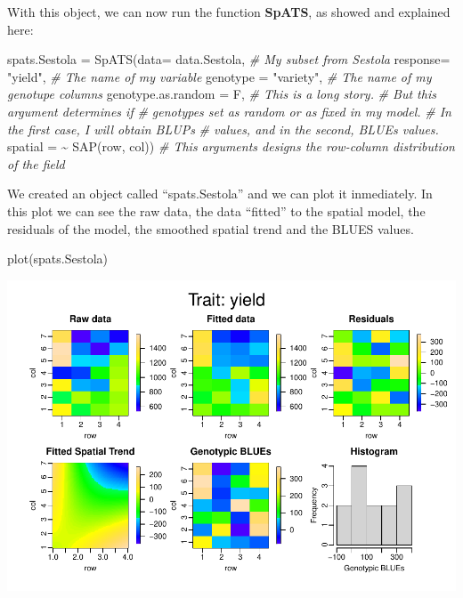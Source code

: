 \documentclass[
]{book}
\newenvironment{Shaded}{\begin{snugshade}}{\end{snugshade}}
\newcommand{\AttributeTok}[1]{\textcolor[rgb]{0.77,0.63,0.00}{#1}}
\newcommand{\CommentTok}[1]{\textcolor[rgb]{0.56,0.35,0.01}{\textit{#1}}}
\newcommand{\FunctionTok}[1]{\textcolor[rgb]{0.00,0.00,0.00}{#1}}
\newcommand{\NormalTok}[1]{#1}
\newcommand{\OtherTok}[1]{\textcolor[rgb]{0.56,0.35,0.01}{#1}}
\newcommand{\SpecialCharTok}[1]{\textcolor[rgb]{0.00,0.00,0.00}{#1}}
\newcommand{\StringTok}[1]{\textcolor[rgb]{0.31,0.60,0.02}{#1}}
\begin{document}
With this object, we can now run the function \textbf{SpATS}, as showed and explained here:

\begin{Shaded}
\begin{Highlighting}[]
\NormalTok{spats.Sestola  }\OtherTok{=}    \FunctionTok{SpATS}\NormalTok{(}\AttributeTok{data=}\NormalTok{      data.Sestola,    }\CommentTok{\# My subset from Sestola  }
                          \AttributeTok{response=} \StringTok{"yield"}\NormalTok{,          }\CommentTok{\# The name of my variable}
                          \AttributeTok{genotype =} \StringTok{"variety"}\NormalTok{,       }\CommentTok{\# The name of my genotupe columns}
                          \AttributeTok{genotype.as.random =}\NormalTok{ F,     }\CommentTok{\# This is a long story. }
                                                      \CommentTok{\# But this argument determines if}
                                                      \CommentTok{\# genotypes set as random or as fixed in my model.}
                                                      \CommentTok{\# In the first case, I will obtain BLUPs }
                                                      \CommentTok{\# values, and in the second, BLUEs values.}
                          \AttributeTok{spatial =} \SpecialCharTok{\textasciitilde{}} \FunctionTok{SAP}\NormalTok{(row, col))  }\CommentTok{\# This arguments designs the row{-}column distribution of the field}
\end{Highlighting}
\end{Shaded}

We created an object called ``spats.Sestola'' and we can plot it inmediately. In this plot we can see the raw data, the data ``fitted'' to the spatial model, the residuals of the model, the smoothed spatial trend and the BLUES values.

\begin{Shaded}
\begin{Highlighting}[]
\FunctionTok{plot}\NormalTok{(spats.Sestola)}
\end{Highlighting}
\end{Shaded}

\includegraphics{PPB-Toolkit-for-R-and-R-Studio_files/figure-latex/myplotSestola-1.pdf}
\end{document}
